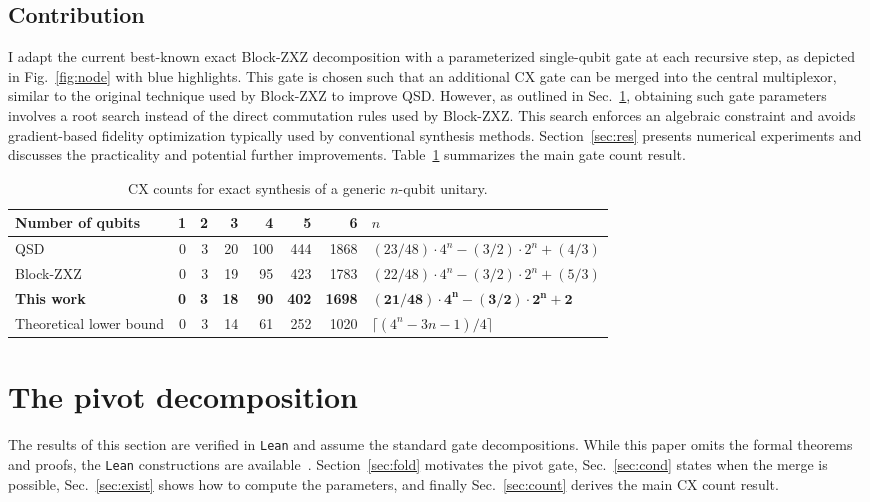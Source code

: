 \documentclass[11pt]{article}
\begin{document}
\subsection{Contribution}

I adapt the current best-known exact Block-ZXZ decomposition with a parameterized single-qubit gate at each recursive step, as depicted in Fig.~\ref{fig:node} with blue highlights. This gate is chosen such that an additional CX gate can be merged into the central multiplexor, similar to the original technique used by Block-ZXZ to improve QSD. However, as outlined in Sec.~\ref{sec:alg}, obtaining such gate parameters involves a root search instead of the direct commutation rules used by Block-ZXZ. This search enforces an algebraic constraint and avoids gradient-based fidelity optimization typically used by conventional synthesis methods. Section~\ref{sec:res} presents numerical experiments and discusses the practicality and potential further improvements. Table~\ref{tab:counts} summarizes the main gate count result.

\begin{table}[H]
\centering
\begin{tabular}{@{}lrrrrrrl@{}}
\toprule
Number of qubits & 1 & 2 & 3 & 4 & 5 & 6 & $n$\\
\midrule
QSD~\cite{smb} & 0 & 3 & 20 & 100 & 444 & 1868 & $(23/48)\cdot4^n-(3/2)\cdot2^n+(4/3)$\\
Block-ZXZ~\cite{zxz} & 0 & 3 & 19 & 95 & 423 & 1783 & $(22/48)\cdot4^n-(3/2)\cdot2^n+(5/3)$\\
\textbf{This work} & \textbf{0} & \textbf{3} & \textbf{18} & \textbf{90} & \textbf{402} & \textbf{1698} & $\boldsymbol{(21/48)\cdot4^n-(3/2)\cdot2^n+2}$\\
\midrule
Theoretical lower bound & 0 & 3 & 14 & 61 & 252 & 1020 & $\lceil(4^n-3n-1)/4\rceil$\\
\bottomrule
\end{tabular}
\caption{CX counts for exact synthesis of a generic $n$-qubit unitary.}
\label{tab:counts}
\end{table}


\section{The pivot decomposition}\label{sec:alg}

The results of this section are verified in \texttt{Lean} and assume the standard gate decompositions. 
While this paper omits the formal theorems and proofs, the \texttt{Lean} constructions are available~\cite{code}.
Section~\ref{sec:fold} motivates the pivot gate, Sec.~\ref{sec:cond} states when the merge is possible,  
Sec.~\ref{sec:exist} shows how to compute the parameters, and finally Sec.~\ref{sec:count} derives the main CX count result. 
\end{document}
